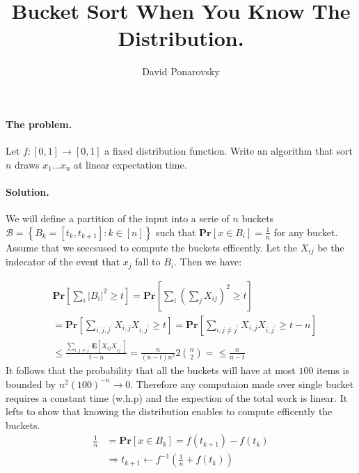 \documentclass{article}
\newcommand{\prb}[1]{ \mathbf{Pr} \left[ {#1} \right]}
\newcommand{\expp}[1]{ \mathbf{E} \left[ {#1} \right]}
\newcommand{\xij} { X_{ij} }
\begin{document}
\title{Bucket Sort When You Know The Distribution.} 
\author{David Ponarovsky}
\maketitle
{} 
\begin{multicols*}{2}

  \paragraph{The problem.} Let $f: [0,1] \rightarrow [0,1]$ a fixed distribution function. Write an algorithm that sort $n$ draws $x_1 ... x_{n}$ at linear expectation time.  
  \paragraph{Solution.} We will define a partition of the input into a serie of $n$ buckets $\mathcal{B} = \left\{ B_{k} = [t_{k}, t_{k+1} ] : k \in [n]  \right\}$ such that $ \prb{ x \in B_{i}} = \frac{1}{n}$ for any bucket. Assume that we seccsused to compute the buckets efficently. Let the $\xij$ be the indecator of the event that $x_{j}$ fall to $B_i$. Then we have:

  \begin{equation*}
    \begin{split}
      & \prb{\sum_{i}{|B_{i}|^{2}} \ge t} = \prb{ \sum_{i}{\left( \sum_{j}X_{ij} \right)^{2}} \ge t   } \\
    & = \prb{ \sum_{i,j,j^{\prime}}{X_{i,j}X_{i,j^{\prime}} } \ge t  } = \prb{ \sum_{i,j\neq j^{\prime}}{X_{i,j}{X_{i,j^{\prime}} } \ge t - n   } }\\ 
    & \le \frac{\sum_{i,j\neq j^{\prime}}{\expp{ X_{ij}X_{ij^{\prime}}  }}}{ t - n  } = \frac{n}{\left( n-t \right)n^{2}}2\binom{n}{2} = \le \frac{n}{n-t}  
    \end{split}
  \end{equation*}
  It follows that the probability that all the buckets will have at most $100$ items is bounded   by $n^{2}\left( 100 \right)^{-n} \rightarrow 0$. Therefore any computaion made over single bucket requires a constant time (w.h.p) and the expection of the total work is linear. 
  It lefts to show that knowing the distribution enables to compute efficently the buckets. 
  \begin{equation*}
    \begin{split}
      \frac{1}{n} &= \prb{ x \in B_{k} } = f\left( t_{k+1} \right)- f\left( t_{k} \right) \\
      & \Rightarrow t_{k+1} \leftarrow f^{-1}\left( \frac{1}{n} + f\left( t_{k} \right) \right) 
    \end{split}
  \end{equation*}



\end{multicols*}
\printbibliography 
\end{document}
